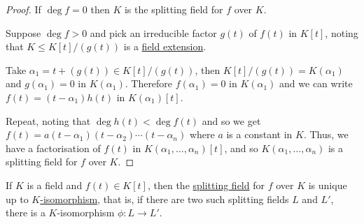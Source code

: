 \documentclass{article}
\begin{document}
\begin{proof}
    If $\deg f = 0$ then $K$ is the splitting field for $f$ over $K$.

    Suppose $\deg f > 0$ and pick an irreducible factor $g(t)$ of $f(t)$ in $K[t]$, noting that $K \leq K[t] / (g(t))$ is a \hyperlink{def:fieldExt}{field extension}.

    Take $\alpha_1 = t + (g(t)) \in K[t]/(g(t))$, then $K[t]/(g(t)) = K(\alpha_1)$ and $g(\alpha_1) = 0$ in $K(\alpha_1)$.
    Therefore $f(\alpha_1) = 0$ in $K(\alpha_1)$ and we can write $f(t) = (t-\alpha_1) h(t)$ in $K(\alpha_1)[t]$.

    Repeat, noting that $\deg h(t) < \deg f(t)$ and so we get $f(t) = a(t - \alpha_1)(t - \alpha_2) \dotsm (t-\alpha_n)$ where $a$ is a constant in $K$.
    Thus, we have a factorisation of $f(t)$ in $K(\alpha_1, \dotsc, \alpha_n)[t]$, and so $K(\alpha_1, \dotsc, \alpha_n)$ is a splitting field for $f$ over $K$.
\end{proof}

\begin{nthm}\label{thm:1.24}
    If $K$ is a field and $f(t) \in K[t]$, then the \hyperlink{def:splitting}{splitting field} for $f$ over $K$ is unique up to \hyperlink{not:hom}{$K$-isomorphism}, that is, if there are two such splitting fields $L$ and $L'$, there is a $K$-isomorphism $\phi: L \to L'$.
\end{nthm}

\end{document}
